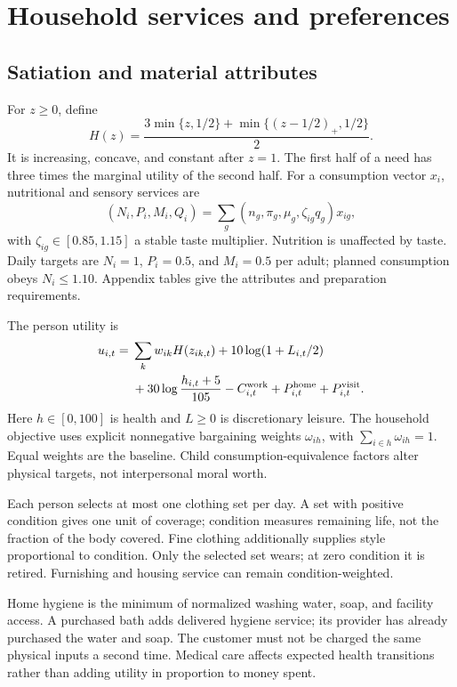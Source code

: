 \documentclass[10pt,a4paper,twocolumn]{article}
\begin{document}
\section{Household services and preferences}
\subsection{Satiation and material attributes}
For $z\geq0$, define
\begin{equation}
 H(z)=\frac{3\min\{z,1/2\}
 +\min\{(z-1/2)_+,1/2\}}{2}.
 \label{eq:H}
\end{equation}
It is increasing, concave, and constant after $z=1$. The first half of a
need has three times the marginal utility of the second half.
For a consumption vector $x_i$, nutritional and sensory services are
\begin{equation}
 (N_i,P_i,M_i,Q_i)
 =\sum_g (n_g,\pi_g,\mu_g,\zeta_{ig}q_g)x_{ig},
 \label{eq:nutrients}
\end{equation}
with $\zeta_{ig}\in[0.85,1.15]$ a stable taste multiplier. Nutrition is
unaffected by taste. Daily targets are $N_i=1$, $P_i=0.5$, and $M_i=0.5$
per adult; planned consumption obeys $N_i\leq1.10$. Appendix tables give
the attributes and preparation requirements.

The person utility is
\begin{align}
 u_{i,t}={}&\sum_k w_{ik}H(z_{ik,t})
 +10\log(1+L_{i,t}/2)\nonumber\\
 &+30\log\frac{h_{i,t}+5}{105}
 -C^{\rm work}_{i,t}
 +P^{\rm home}_{i,t}+P^{\rm visit}_{i,t}.
 \label{eq:utility}
\end{align}
Here $h\in[0,100]$ is health and $L\geq0$ is discretionary leisure.
The household objective uses explicit nonnegative bargaining weights
$\omega_{ih}$, with $\sum_{i\in h}\omega_{ih}=1$. Equal weights are the
baseline. Child consumption-equivalence factors alter physical targets,
not interpersonal moral worth.

Each person selects at most one clothing set per day. A set with positive
condition gives one unit of coverage; condition measures remaining life,
not the fraction of the body covered. Fine clothing additionally supplies
style proportional to condition. Only the selected set wears; at zero
condition it is retired. Furnishing and housing service can remain
condition-weighted.

Home hygiene is the minimum of normalized washing water, soap, and
facility access. A purchased bath adds delivered hygiene service; its
provider has already purchased the water and soap. The customer must not
be charged the same physical inputs a second time. Medical care affects
expected health transitions rather than adding utility in proportion to
money spent.
\end{document}

